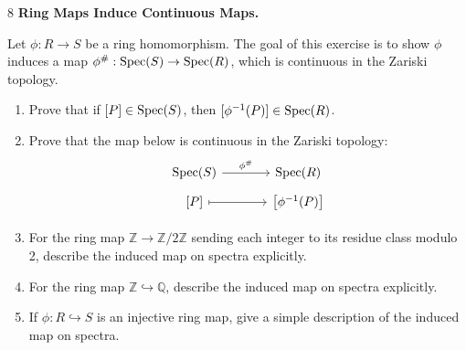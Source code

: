 \documentclass[Notebook.tex]{subfiles}
\begin{document}
\hrulefill

\newpage 

\begin{problem}{8} \textbf{Ring Maps Induce Continuous Maps.} 

Let $\phi:R \to S$ be a ring homomorphism. The goal of this exercise is to show $\phi$ induces a map $\phi^{\#}:\operatorname{Spec}(S) \to \operatorname{Spec}(R)$, which is continuous in the Zariski topology.
\begin{enumerate}[label=(\alph*),ref=\theenumi\alph*]
	 \item Prove that if $[P] \in \operatorname{Spec}(S)$, then $[\phi^{-1}(P)] \in  \operatorname{Spec}(R)$.
	 \item Prove that the map below is continuous in the Zariski topology:
	 \[
	 \begin{tikzcd}[row sep = .5em, column sep = 3.5em]
	 \Spec(S) \arrow[r,"\phi^{\#}"] & \Spec(R) \\
	 \left[P\right] \arrow[r,mapsto] & \left[ \phi^{-1}(P)\right]
	 \end{tikzcd}
	 \]
	 \item For the ring map $\mathbb Z \rightarrow \mathbb Z/2\mathbb Z$ sending each integer to its residue class modulo 2, describe the induced map on spectra explicitly.
	 \item For the ring map $\mathbb Z \hookrightarrow \mathbb Q$, describe the induced map on spectra explicitly.
	 \item If $\phi: R \hookrightarrow S$ is an injective ring map, give a simple description of the induced map on spectra. 
  \end{enumerate}

\end{problem}
\end{document}
